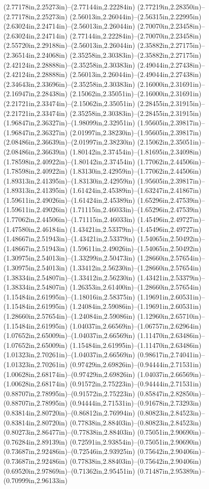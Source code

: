 (2.77178in,2.25273in)--(2.77144in,2.22284in) (2.77219in,2.28350in)--(2.77178in,2.25273in) (2.56013in,2.26044in)--(2.56315in,2.22995in) (2.63024in,2.24714in)--(2.56013in,2.26044in) (2.70070in,2.23458in)--(2.63024in,2.24714in) (2.77144in,2.22284in)--(2.70070in,2.23458in) (2.55720in,2.29188in)--(2.56013in,2.26044in) (2.35882in,2.27175in)--(2.36514in,2.24068in) (2.35258in,2.30383in)--(2.35882in,2.27175in) (2.42124in,2.28888in)--(2.35258in,2.30383in) (2.49044in,2.27438in)--(2.42124in,2.28888in) (2.56013in,2.26044in)--(2.49044in,2.27438in) (2.34643in,2.33696in)--(2.35258in,2.30383in) (2.16000in,2.31691in)--(2.16947in,2.28438in) (2.15062in,2.35051in)--(2.16000in,2.31691in) (2.21721in,2.33474in)--(2.15062in,2.35051in) (2.28455in,2.31915in)--(2.21721in,2.33474in) (2.35258in,2.30383in)--(2.28455in,2.31915in) (1.96847in,2.36327in)--(1.98099in,2.32951in) (1.95605in,2.39817in)--(1.96847in,2.36327in) (2.01997in,2.38230in)--(1.95605in,2.39817in) (2.08486in,2.36639in)--(2.01997in,2.38230in) (2.15062in,2.35051in)--(2.08486in,2.36639in) (1.80142in,2.37454in)--(1.81695in,2.34098in) (1.78598in,2.40922in)--(1.80142in,2.37454in) (1.77062in,2.44506in)--(1.78598in,2.40922in) (1.83130in,2.42959in)--(1.77062in,2.44506in) (1.89313in,2.41395in)--(1.83130in,2.42959in) (1.95605in,2.39817in)--(1.89313in,2.41395in) (1.61424in,2.45389in)--(1.63247in,2.41867in) (1.59611in,2.49026in)--(1.61424in,2.45389in) (1.65296in,2.47539in)--(1.59611in,2.49026in) (1.71115in,2.46033in)--(1.65296in,2.47539in) (1.77062in,2.44506in)--(1.71115in,2.46033in) (1.45496in,2.49727in)--(1.47580in,2.46184in) (1.43421in,2.53379in)--(1.45496in,2.49727in) (1.48667in,2.51943in)--(1.43421in,2.53379in) (1.54065in,2.50492in)--(1.48667in,2.51943in) (1.59611in,2.49026in)--(1.54065in,2.50492in) (1.30975in,2.54013in)--(1.33299in,2.50473in) (1.28660in,2.57654in)--(1.30975in,2.54013in) (1.33412in,2.56230in)--(1.28660in,2.57654in) (1.38334in,2.54807in)--(1.33412in,2.56230in) (1.43421in,2.53379in)--(1.38334in,2.54807in) (1.26353in,2.61400in)--(1.28660in,2.57654in) (1.15484in,2.61995in)--(1.18016in,2.58375in) (1.19691in,2.60531in)--(1.15484in,2.61995in) (1.24084in,2.59086in)--(1.19691in,2.60531in) (1.28660in,2.57654in)--(1.24084in,2.59086in) (1.12960in,2.65710in)--(1.15484in,2.61995in) (1.04037in,2.66569in)--(1.06757in,2.62964in) (1.07652in,2.65009in)--(1.04037in,2.66569in) (1.11470in,2.63486in)--(1.07652in,2.65009in) (1.15484in,2.61995in)--(1.11470in,2.63486in) (1.01323in,2.70261in)--(1.04037in,2.66569in) (0.98617in,2.74041in)--(1.01323in,2.70261in) (0.97429in,2.69826in)--(0.94444in,2.71531in) (1.00628in,2.68174in)--(0.97429in,2.69826in) (1.04037in,2.66569in)--(1.00628in,2.68174in) (0.91572in,2.75223in)--(0.94444in,2.71531in) (0.88707in,2.78995in)--(0.91572in,2.75223in) (0.85847in,2.82850in)--(0.88707in,2.78995in) (0.94444in,2.71531in)--(0.91678in,2.73293in) (0.83814in,2.80720in)--(0.86812in,2.76994in) (0.80823in,2.84523in)--(0.83814in,2.80720in) (0.77838in,2.88403in)--(0.80823in,2.84523in) (0.80273in,2.86477in)--(0.77838in,2.88403in) (0.75051in,2.90690in)--(0.76284in,2.89139in) (0.72591in,2.93854in)--(0.75051in,2.90690in) (0.73687in,2.92486in)--(0.72546in,2.93925in) (0.75642in,2.90406in)--(0.73687in,2.92486in) (0.77838in,2.88403in)--(0.75642in,2.90406in) (0.69520in,2.97869in)--(0.71362in,2.95451in) (0.71487in,2.95389in)--(0.70999in,2.96133in) 